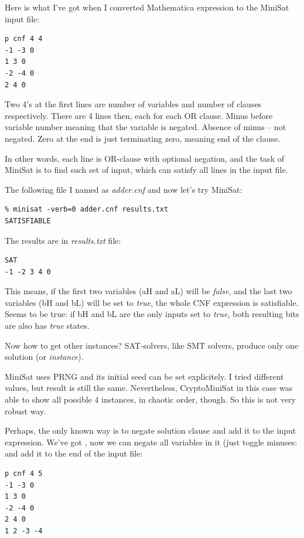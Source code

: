 Here is what I've got when I converted Mathematica expression to the MiniSat input file:

\begin{lstlisting}
p cnf 4 4
-1 -3 0
1 3 0
-2 -4 0
2 4 0
\end{lstlisting}

Two 4's at the first lines are number of variables and number of clauses respectively.
There are 4 lines then, each for each OR clause.
Minus before variable number meaning that the variable is negated.
Absence of minus -- not negated.
Zero at the end is just terminating zero, meaning end of the clause.

In other words, each line is OR-clause with optional negation, and the task of MiniSat is to find such set of input, which can satisfy all lines
in the input file.

The following file I named as \textit{adder.cnf} and now let's try MiniSat:

\begin{lstlisting}
% minisat -verb=0 adder.cnf results.txt
SATISFIABLE
\end{lstlisting}

The results are in \textit{results.txt} file:

\begin{lstlisting}
SAT
-1 -2 3 4 0
\end{lstlisting}

This means, if the first two variables (aH and aL) will be \textit{false}, and the last two variables (bH and bL) will be set to \textit{true},
the whole CNF expression is satisfiable.
Seems to be true: if bH and bL are the only inputs set to \textit{true}, both resulting bits are also has \textit{true} states.

Now how to get other instances? \ac{SAT}-solvers, like \ac{SMT} solvers, produce only one solution (or \textit{instance}).

MiniSat uses PRNG and its initial seed can be set explicitely. I tried different values, but result is still the same.
Nevertheless, CryptoMiniSat in this case was able to show all possible 4 instances, in chaotic order, though.
So this is not very robust way.

Perhaps, the only known way is to negate solution clause and add it to the input expression.
We've got , 
now we can negate all variables in it (just toggle minuses:  and add it to the end of the input file:

\begin{lstlisting}
p cnf 4 5
-1 -3 0
1 3 0
-2 -4 0
2 4 0
1 2 -3 -4
\end{lstlisting}

